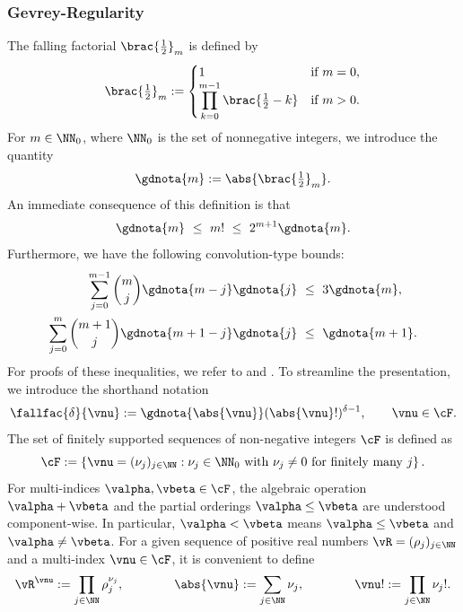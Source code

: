 \subsubsection{Gevrey-Regularity}
The falling factorial $\brac{\tfrac{1}{2}}_m$ is defined by
\begin{equation*}
	\brac{\tfrac{1}{2}}_m
	:=
	\begin{cases}
		1 \quad & \text{if } m=0, \\
		\displaystyle \prod_{{k=0}}^{m-1} \brac{\tfrac{1}{2} - k}& \text{if } m > 0. 
	\end{cases}	
\end{equation*}	
For $m \in \NN_0$, where $\NN_0$ is the set of nonnegative integers, we introduce the quantity
\begin{equation*}
	\gdnota{m} := \abs{\brac{\tfrac{1}{2}}_m}.
\end{equation*}	
An immediate consequence of this definition is that
\begin{equation} \label{ineq: ffac_m}
	\gdnota{m}
	\ \le \ m!
	\ \le \ 
	2^{m+1} \gdnota{m}.
\end{equation}	
Furthermore, we have the following convolution-type bounds:
\begin{subequations}\label{ineq: sum-ffac a}
\begin{align} 
	\sum_{j=0}^{m-1}\binom{m}{j}\gdnota{m-j}\gdnota{j} \ &\le \  3 \gdnota{m}, \label{ineq: sum-ffac}\\
	\sum_{j=0}^{m}\binom{m+1}{j}\gdnota{m+1-j}\gdnota{j} \ &\le \  \gdnota{m+1}. \label{ineq: sum-ffac 2}
\end{align}	
\end{subequations}
For proofs of these inequalities, we refer to \cite[Lemma 2.3]{CL2024} and \cite[Lemma 2.1]{CL2024b}.
	To streamline the presentation, we introduce the shorthand notation
	\begin{equation*}
		\fallfac{\delta}{\vnu} :=  \gdnota{\abs{\vnu}}  (\abs{\vnu}!)^{\delta-1}, {\qquad \vnu \in \cF.}
	\end{equation*}
The set of finitely supported sequences of non-negative integers $\cF$ is defined as
\begin{equation}\label{cF-def}
	\cF := 
	\left\{
	\vnu ={(\nu_j)_{j \in \NN}} : \nu_j\in \NN_0 \text{ with } \nu_j \neq 0 \text{ for  finitely many } j
	\right\}.
\end{equation}
For multi-indices $\valpha, \vbeta \in \cF$, the algebraic operation $\valpha + \vbeta$ and the partial orderings $\valpha \leq \vbeta$ are understood component-wise. In particular, $\valpha < \vbeta$ means $\valpha \leq \vbeta$ and $\valpha \neq \vbeta$. For a given sequence of positive real numbers $\vR=(\rho_j)_{j{\in \NN}}$ and a multi-index $\vnu \in \cF$, it is convenient to define
\begin{align*}
	\vR^{\vnu} := \prod_{j{\in \NN}} \rho_j^{\nu_j},
	\qquad \qquad
	\abs{\vnu} := \sum_{j{\in \NN}} \nu_j, 
	\qquad \qquad
	\vnu! := \prod_{j{\in \NN}} \nu_j!. 
\end{align*}


